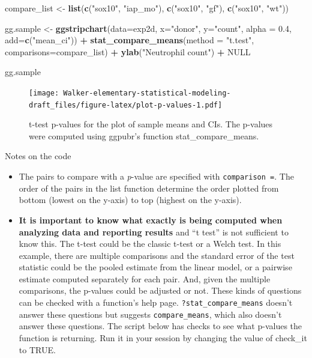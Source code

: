 \documentclass[]{book}
\newenvironment{Shaded}{\begin{snugshade}}{\end{snugshade}}
\newcommand{\DataTypeTok}[1]{\textcolor[rgb]{0.13,0.29,0.53}{#1}}
\newcommand{\FloatTok}[1]{\textcolor[rgb]{0.00,0.00,0.81}{#1}}
\newcommand{\KeywordTok}[1]{\textcolor[rgb]{0.13,0.29,0.53}{\textbf{#1}}}
\newcommand{\NormalTok}[1]{#1}
\newcommand{\OperatorTok}[1]{\textcolor[rgb]{0.81,0.36,0.00}{\textbf{#1}}}
\newcommand{\OtherTok}[1]{\textcolor[rgb]{0.56,0.35,0.01}{#1}}
\newcommand{\StringTok}[1]{\textcolor[rgb]{0.31,0.60,0.02}{#1}}
\begin{document}
\begin{Shaded}
\begin{Highlighting}[]
\NormalTok{compare_list <-}\StringTok{ }\KeywordTok{list}\NormalTok{(}\KeywordTok{c}\NormalTok{(}\StringTok{"sox10"}\NormalTok{, }\StringTok{"iap_mo"}\NormalTok{), }\KeywordTok{c}\NormalTok{(}\StringTok{"sox10"}\NormalTok{, }\StringTok{"gf"}\NormalTok{), }\KeywordTok{c}\NormalTok{(}\StringTok{"sox10"}\NormalTok{, }\StringTok{"wt"}\NormalTok{))}

\NormalTok{gg.sample <-}\StringTok{ }\KeywordTok{ggstripchart}\NormalTok{(}\DataTypeTok{data=}\NormalTok{exp2d,}
          \DataTypeTok{x=}\StringTok{"donor"}\NormalTok{, }
          \DataTypeTok{y=}\StringTok{"count"}\NormalTok{,}
          \DataTypeTok{alpha =} \FloatTok{0.4}\NormalTok{,}
          \DataTypeTok{add=}\KeywordTok{c}\NormalTok{(}\StringTok{"mean_ci"}\NormalTok{)) }\OperatorTok{+}
\StringTok{  }\KeywordTok{stat_compare_means}\NormalTok{(}\DataTypeTok{method =} \StringTok{"t.test"}\NormalTok{, }\DataTypeTok{comparisons=}\NormalTok{compare_list) }\OperatorTok{+}
\StringTok{  }\KeywordTok{ylab}\NormalTok{(}\StringTok{"Neutrophil count"}\NormalTok{) }\OperatorTok{+}
\StringTok{  }\OtherTok{NULL}

\NormalTok{gg.sample}
\end{Highlighting}
\end{Shaded}

\begin{figure}
\centering
\texttt{[image: Walker-elementary-statistical-modeling-draft\_files/figure-latex/plot-p-values-1.pdf]}
\caption{\label{fig:plot-p-values}t-test p-values for the plot of sample means and CIs. The p-values were computed using ggpubr's function stat\_compare\_means.}
\end{figure}

Notes on the code

\begin{itemize}
\item
  The pairs to compare with a \emph{p}-value are specified with \texttt{comparison\ =}. The order of the pairs in the list function determine the order plotted from bottom (lowest on the y-axis) to top (highest on the y-axis).
\item
  \textbf{It is important to know what exactly is being computed when analyzing data and reporting results} and ``t test'' is not sufficient to know this. The t-test could be the classic t-test or a Welch test. In this example, there are multiple comparisons and the standard error of the test statistic could be the pooled estimate from the linear model, or a pairwise estimate computed separately for each pair. And, given the multiple comparisons, the p-values could be adjusted or not. These kinds of questions can be checked with a function's help page. \texttt{?stat\_compare\_means} doesn't answer these questions but suggests \texttt{compare\_means}, which also doesn't answer these questions. The script below has checks to see what p-values the function is returning. Run it in your session by changing the value of check\_it to TRUE.
\end{itemize}
\end{document}
